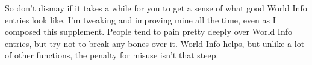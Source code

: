 \documentclass[Coomer-main.tex]{subfiles}
\begin{document}
So don’t dismay if it takes a while for you to get a sense of what good World Info entries look like.
I’m tweaking and improving mine all the time, even as I composed this supplement.
People tend to pain pretty deeply over World Info entries, but try not to break any bones over it.
World Info helps, but unlike a lot of other functions, the penalty for misuse isn’t that steep.
\end{document}
